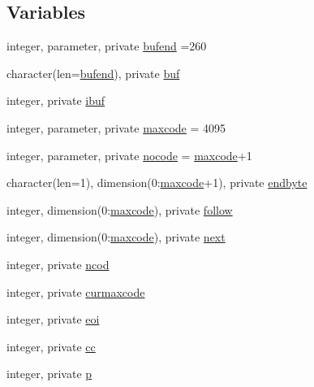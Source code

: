 \subsection*{Variables}
\begin{DoxyCompactItemize}
\item 
integer, parameter, private \mbox{\hyperlink{namespacem__writegif_accdaeeac4357a3dc3dead0ba36e7efd4}{bufend}} =260
\item 
character(len=\mbox{\hyperlink{namespacem__writegif_accdaeeac4357a3dc3dead0ba36e7efd4}{bufend}}), private \mbox{\hyperlink{namespacem__writegif_aa50fc715675e43931ce58f557bf8eb02}{buf}}
\item 
integer, private \mbox{\hyperlink{namespacem__writegif_a51ee343cdcbf2cd11f1b3740651077eb}{ibuf}}
\item 
integer, parameter, private \mbox{\hyperlink{namespacem__writegif_ac55f9abf33971ad396b2ae59b288b0bb}{maxcode}} = 4095
\item 
integer, parameter, private \mbox{\hyperlink{namespacem__writegif_a39141257b89b2cea89b4db4e0a372ffa}{nocode}} = \mbox{\hyperlink{namespacem__writegif_ac55f9abf33971ad396b2ae59b288b0bb}{maxcode}}+1
\item 
character(len=1), dimension(0\+:\mbox{\hyperlink{namespacem__writegif_ac55f9abf33971ad396b2ae59b288b0bb}{maxcode}}+1), private \mbox{\hyperlink{namespacem__writegif_a43cdcf79f632247eaebb73fc3a7ff25f}{endbyte}}
\item 
integer, dimension(0\+:\mbox{\hyperlink{namespacem__writegif_ac55f9abf33971ad396b2ae59b288b0bb}{maxcode}}), private \mbox{\hyperlink{namespacem__writegif_aea2ce887598c0e5d80adb90558230c32}{follow}}
\item 
integer, dimension(0\+:\mbox{\hyperlink{namespacem__writegif_ac55f9abf33971ad396b2ae59b288b0bb}{maxcode}}), private \mbox{\hyperlink{namespacem__writegif_a592346fdf478d7727c143cd25ece2a96}{next}}
\item 
integer, private \mbox{\hyperlink{namespacem__writegif_aac26e9673fe5e79908a6ff576a298986}{ncod}}
\item 
integer, private \mbox{\hyperlink{namespacem__writegif_a634657dd81148fd56f39232d7ceda8b5}{curmaxcode}}
\item 
integer, private \mbox{\hyperlink{namespacem__writegif_a4f0ce85ba2c32d98d9c88801be25cd1f}{eoi}}
\item 
integer, private \mbox{\hyperlink{namespacem__writegif_a4dc9a91a4e7fde14eff0bab58278e61b}{cc}}
\item 
integer, private \mbox{\hyperlink{namespacem__writegif_a34d3a64b1381a281909da380d922d770}{p}}

\end{DoxyCompactItemize}
